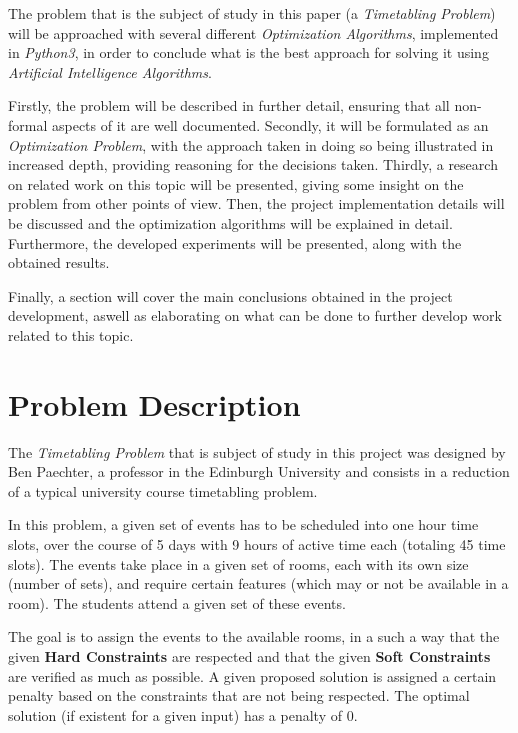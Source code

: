 \documentclass[conference]{IEEEtran}
\begin{document}
The problem that is the subject of study in this paper (a \textit{Timetabling Problem}) will be approached with several different \textit{Optimization Algorithms}, implemented in \textit{Python3}, in order to conclude what is the best approach for solving it using \textit{Artificial Intelligence Algorithms}.

Firstly, the problem will be described in further detail, ensuring that all non-formal aspects of it are well documented. Secondly, it will be formulated as an \textit{Optimization Problem}, with the approach taken in doing so being illustrated in increased depth, providing reasoning for the decisions taken. Thirdly, a research on related work on this topic will be presented, giving some insight on the problem from other points of view. Then, the project implementation details will be discussed and the optimization algorithms will be explained in detail. Furthermore, the developed experiments will be presented, along with the obtained results.

Finally, a section will cover the main conclusions obtained in the project development, aswell as elaborating on what can be done to further develop work related to this topic.

\section{Problem Description}

The \textit{Timetabling Problem} that is subject of study in this project was designed by Ben Paechter, a professor in the Edinburgh University and consists in a reduction of a typical university course timetabling problem.

In this problem, a given set of events has to be scheduled into one hour time slots, over the course of 5 days with 9 hours of active time each (totaling 45 time slots). The events take place in a given set of rooms, each with its own size (number of sets), and require certain features (which may or not be available in a room). The students attend a given set of these events. 

The goal is to assign the events to the available rooms, in a such a way that the given \textbf{Hard Constraints} are respected and that the given \textbf{Soft Constraints} are verified as much as possible. A given proposed solution is assigned a certain penalty based on the constraints that are not being respected. The optimal solution (if existent for a given input) has a penalty of 0.
\end{document}
